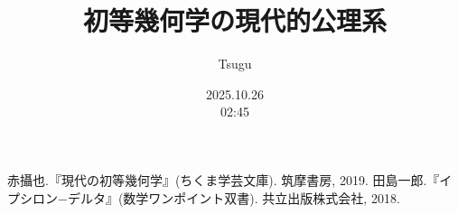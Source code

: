 \documentclass[dvipdfmx,12pt]{jsreport}
\title{初等幾何学の現代的公理系}
\date{2025.10.26\\02:45}
\author{Tsugu}
\theoremstyle{definition}
\theoremstyle{plain}
\begin{document}
  \maketitle
  
  \tableofcontents
  
  
  
  
  
  
  
  \begin{thebibliography}{99}
     赤攝也.『現代の初等幾何学』(ちくま学芸文庫). 筑摩書房, 2019.
     田島一郎.『イプシロン−デルタ』(数学ワンポイント双書). 共立出版株式会社, 2018.
  \end{thebibliography}
  \clearpage
  \printindex
\end{document}
